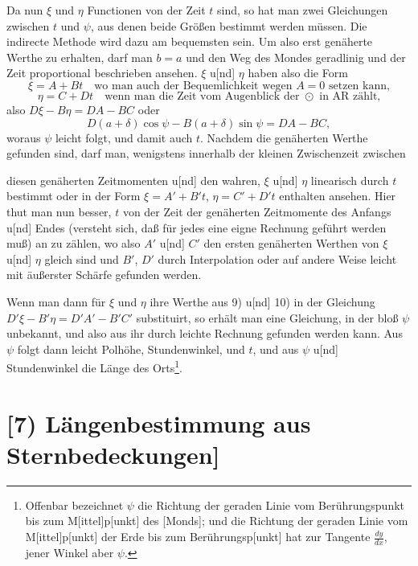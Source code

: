 \documentclass[12pt,a4paper]{article}
\theoremstyle{plain}
\theoremstyle{definition}
\theoremstyle{remark}
\begin{document}
Da nun $\xi$ und $\eta$ Functionen von der Zeit $t$ sind, so hat man zwei Gleichungen zwischen $t$ und $\psi$, aus denen beide Gr\"o\ss en bestimmt werden m\"ussen. Die indirecte Methode wird dazu am bequemsten sein. Um also erst gen\"aherte Werthe zu erhalten, darf man $b = a$ und den Weg des Mondes geradlinig und der Zeit proportional beschrieben ansehen. $\xi$ u[nd] $\eta$ haben also die Form
\[
\xi = A + Bt \quad \text{wo man auch der Bequemlichkeit wegen } A = 0 \text{ setzen kann,}
\]
\[
\eta = C + Dt \quad \text{wenn man die Zeit vom Augenblick der } \odot \text{ in AR z\"ahlt,}
\]
also $D\xi - B\eta = DA - BC$ oder
\[
D(a+\delta)\cos\psi - B(a+\delta)\sin\psi = DA - BC,
\]
woraus $\psi$ leicht folgt, und damit auch $t$. Nachdem die gen\"aherten Werthe gefunden sind, darf man, wenigstens innerhalb der kleinen Zwischenzeit zwischen

\newpage

diesen gen\"aherten Zeitmomenten u[nd] den wahren, $\xi$ u[nd] $\eta$ linearisch durch $t$ bestimmt oder in der Form $\xi = A' + B't$, $\eta = C' + D't$ enthalten ansehen. Hier thut man nun besser, $t$ von der Zeit der gen\"aherten Zeitmomente des Anfangs u[nd] Endes (versteht sich, da\ss{} f\"ur jedes eine eigne Rechnung gef\"uhrt werden mu\ss) an zu z\"ahlen, wo also $A'$ u[nd] $C'$ den ersten gen\"aherten Werthen von $\xi$ u[nd] $\eta$ gleich sind und $B'$, $D'$ durch Interpolation oder auf andere Weise leicht mit \"au\ss erster Sch\"arfe gefunden werden.

Wenn man dann f\"ur $\xi$ und $\eta$ ihre Werthe aus 9) u[nd] 10) in der Gleichung $D'\xi - B'\eta = D'A' - B'C'$ substituirt, so erh\"alt man eine Gleichung, in der blo\ss{} $\psi$ unbekannt, und also aus ihr durch leichte Rechnung gefunden werden kann. Aus $\psi$ folgt dann leicht Polh\"ohe, Stundenwinkel, und $t$, und aus $\psi$ u[nd] Stundenwinkel die L\"ange des Orts\footnote{Offenbar bezeichnet $\psi$ die Richtung der geraden Linie vom Ber\"uhrungspunkt bis zum M[ittel]p[unkt] des [Monds]; und die Richtung der geraden Linie vom M[ittel]p[unkt] der Erde bis zum Ber\"uhrungsp[unkt] hat zur Tangente $\tfrac{dy}{dx}$, jener Winkel aber $\psi$.}.

\newpage

\section*{[7) L\"angenbestimmung aus Sternbedeckungen]}
\end{document}
